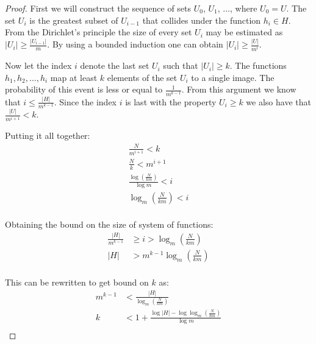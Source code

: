 \begin{proof}
First we will construct the sequence of sets $U_0$, $U_1$, $\dots$, where $U_0 = U$. The set $U_i$ is the greatest subset of $U_{i - 1}$ that collides under the function $h_i \in H$. From the Dirichlet's principle the size of every set $U_i$ may be estimated as $|U_i| \geq \frac{|U_{i - 1}|}{m}$. By using a bounded induction one can obtain $|U_i| \geq \frac{|U|}{m^i}$.

Now let the index $i$ denote the last set $U_i$ such that $|U_i| \geq k$. The functions $h_1, h_2,\dots, h_i$ map at least $k$ elements of the set $U_i$ to a single image. The probability of this event is less or equal to $\frac{1}{m ^ {k - 1}}$. From this argument we know that $i \leq \frac{|H|}{m ^ {k - 1}}$. Since the index $i$ is last with the property $U_i \geq k$ we also have that $\frac{|U|}{m ^ {i + 1}} < k$. 

Putting it all together:
\begin{gather*}
\frac{N}{m^{i + 1}} < k \\
\frac{N}{k} < m ^ {i + 1} \\
\frac{\log \left( \frac{N}{km} \right)}{\log m} < i \\
\log_m \left( \frac{N}{km} \right) < i \\
\end{gather*}

Obtaining the bound on the size of system of functions:
\begin{displaymath}
\begin{split}
\frac{|H|}{m^{k - 1}} & \geq i > \log_m \left( \frac{N}{km} \right) \\
|H| & > m^{k - 1} \log_m \left( \frac{N}{km} \right) \\
\end{split}
\end{displaymath}

This can be rewritten to get bound on $k$ as:
\begin{displaymath}
\begin{split}
m^{k - 1} & < \frac{|H|}{\log_m \left( \frac{N}{km} \right)} \\
k & < 1 + \frac{\log |H| - \log \log_m \left( \frac{N}{km} \right)}{\log m} \\
\end{split}
\end{displaymath}
\end{proof}

